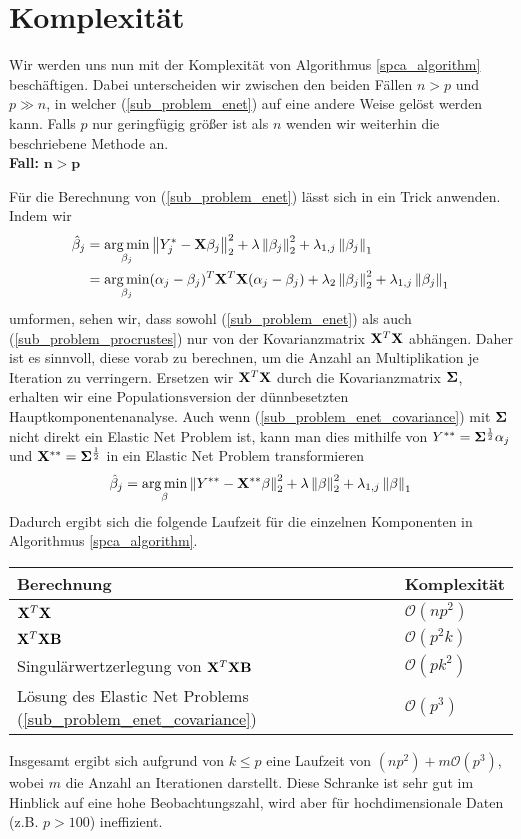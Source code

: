 \section{Komplexität}
\label{complexity}

Wir werden uns nun mit der Komplexität von Algorithmus \ref{spca_algorithm} beschäftigen. Dabei unterscheiden wir zwischen den beiden Fällen $n > p$ und $p \gg n$, in welcher (\ref{sub_problem_enet}) auf eine andere Weise gelöst werden kann. Falls $p$ nur geringfügig größer ist als $n$ wenden wir weiterhin die beschriebene Methode an.\\

\textbf{Fall: } $\mathbf{n > p}$

Für die Berechnung von (\ref{sub_problem_enet}) lässt sich in ein Trick anwenden. Indem wir
\begin{align}
\label{sub_problem_enet_covariance}
\hat{\beta}_j & = \operatorname*{arg\,min}_{\beta_j} \left\lVert Y_j^* - \mathbf{X} \beta_j \right\rVert_2^2 + \lambda \left\lVert \beta_j \right\rVert_2^2 + \lambda_{1,j}\left\lVert \beta_j \right\rVert_1 \nonumber\\
& = \operatorname*{arg\,min}_{\beta_j} (\alpha_j - \beta_j)^T \mathbf{X}^T \mathbf{X} (\alpha_j - \beta_j) + \lambda_2 \left\lVert \beta_j \right\rVert_2^2 + \lambda_{1,j}\left\lVert \beta_j \right\rVert_1
\end{align}
umformen, sehen wir, dass sowohl (\ref{sub_problem_enet}) als auch (\ref{sub_problem_procrustes}) nur von der Kovarianzmatrix $\mathbf{X}^T \mathbf{X}$ abhängen. Daher ist es sinnvoll, diese vorab zu berechnen, um die Anzahl an Multiplikation je Iteration zu verringern. Ersetzen wir $\mathbf{X}^T\mathbf{X}$ durch die Kovarianzmatrix $\mathbf{\Sigma}$, erhalten wir eine Populationsversion der dünnbesetzten Hauptkomponentenanalyse. Auch wenn (\ref{sub_problem_enet_covariance}) mit $\mathbf{\Sigma}$ nicht direkt ein Elastic Net Problem ist, kann man dies mithilfe von $Y^{**} = \mathbf{\Sigma}^{\frac{1}{2}} \alpha_j$ und $\mathbf{X}^{**} = \mathbf{\Sigma}^{\frac{1}{2}}$ in ein Elastic Net Problem transformieren
$$\hat{\beta}_j = \operatorname*{arg\,min}_{\beta} \left\lVert Y^{**} - \mathbf{X}^{**} \beta \right\rVert_2^2 + \lambda \left\lVert \beta \right\rVert_2^2 + \lambda_{1,j}\left\lVert \beta \right\rVert_1$$
Dadurch ergibt sich die folgende Laufzeit für die einzelnen Komponenten in Algorithmus \ref{spca_algorithm}.

\begin{table}
\centering
\begin{tabular}{ll}
Berechnung & Komplexität\\\hline\hspace{0.2cm}
$\mathbf{X}^T\mathbf{X}$ & $\mathcal{O}(np^2)$\\
$\mathbf{X}^T\mathbf{X} \mathbf{B}$ & $\mathcal{O}(p^2k)$\\
Singulärwertzerlegung von $\mathbf{X}^T\mathbf{X} \mathbf{B}$ & $\mathcal{O}(pk^2)$\\
Lösung des Elastic Net Problems (\ref{sub_problem_enet_covariance}) & $\mathcal{O}(p^3)$
\end{tabular}
\end{table}
Insgesamt ergibt sich aufgrund von $k \leq p$ eine Laufzeit von $(np^2) + m\mathcal{O}(p^3)$, wobei $m$ die Anzahl an Iterationen darstellt. Diese Schranke ist sehr gut im Hinblick auf eine hohe Beobachtungszahl, wird aber für hochdimensionale Daten (z.B. $p > 100$) ineffizient.\\


